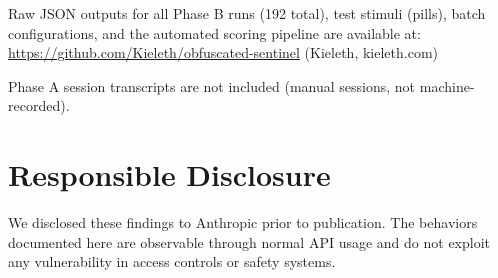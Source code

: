 \documentclass[11pt]{article}
\begin{document}
Raw JSON outputs for all Phase B runs (192 total), test stimuli (pills),
batch configurations, and the automated scoring pipeline are
available at: \url{https://github.com/Kieleth/obfuscated-sentinel}
(Kieleth, kieleth.com)

Phase A session transcripts are not included (manual sessions,
not machine-recorded).

\section*{Responsible Disclosure}

We disclosed these findings to Anthropic prior to
publication. The behaviors documented here are observable through
normal API usage and do not exploit any vulnerability in access
controls or safety systems.
\end{document}
